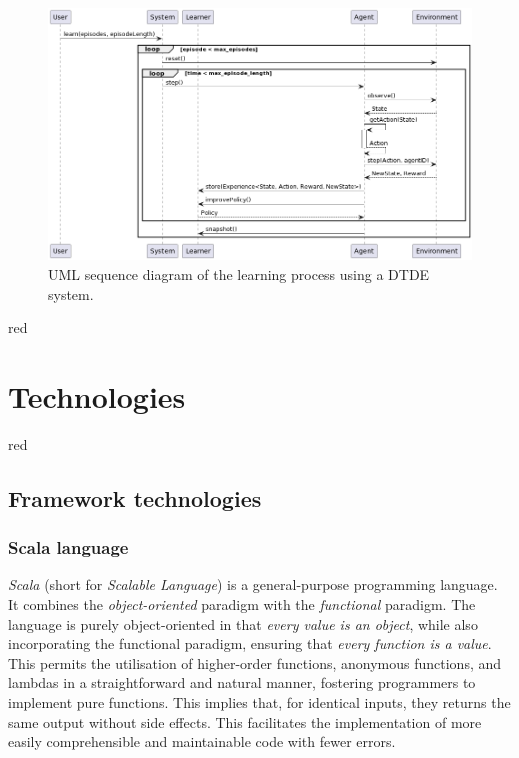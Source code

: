 \documentclass[12pt,a4paper,openright,twoside]{book}
\begin{document}
\begin{figure}[t]
    \centering
    \includegraphics[width=\textwidth]{figures/DTDE-System-Sequence-Diagram.png}
    \caption{UML sequence diagram of the learning process using a DTDE system.}
    \label{fig:dtde-sequence}
\end{figure}

\begin{color}{red}
\chapter{Technologies} 
\label{chap:project}
\end{color}
\begin{color}{red}
\section{Framework technologies}
\end{color}
\subsection*{Scala language}

\emph{Scala} (short for \emph{Scalable Language}) is a general-purpose programming language. 
    It combines the \emph{object-oriented} paradigm with the \emph{functional} paradigm. The language is purely object-oriented 
    in that \emph{every value is an object}, while also incorporating the functional paradigm, ensuring 
    that \emph{every function is a value}. This permits the utilisation of higher-order functions, anonymous functions, and 
    lambdas in a straightforward and natural manner, fostering programmers to implement pure functions. This implies that, 
    for identical inputs, they returns the same output without side effects. This facilitates the implementation of more easily 
    comprehensible and maintainable code with fewer errors.
\end{document}
